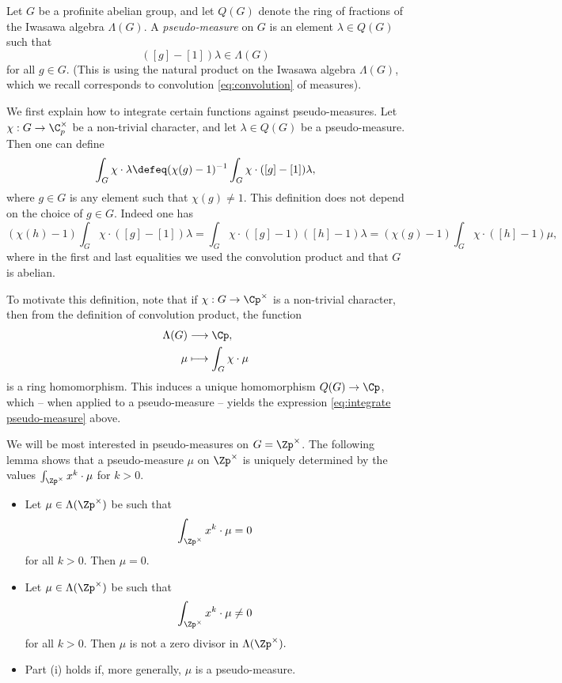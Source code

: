 \documentclass[a4paper,10pt, english, reqno]{smfart}
\numberwithin{equation}{section}
\begin{document}
\begin{definition}
	Let $G$ be a profinite abelian group, and let $Q(G)$ denote the ring of fractions of the Iwasawa algebra $\Lambda(G)$. A \emph{pseudo-measure} on $G$ is an element $\lambda \in Q(G)$ such that 
	\[
 ([g]-[1])\lambda \in \Lambda(G)
 \]
	for all $g \in G$.  (This is using the natural product on the Iwasawa algebra $\Lambda(G)$, which we recall corresponds to convolution \eqref{eq:convolution} of measures).
\end{definition}


 We first explain how to integrate certain functions against pseudo-measures. Let $\chi : G \to \C_p^\times$ be a non-trivial character, and let $\lambda \in Q(G)$ be a pseudo-measure. Then one can define
\begin{equation}\label{eq:integrate pseudo-measure}
\int_G \chi \cdot \lambda \defeq (\chi(g) - 1)^{-1} \int_G \chi \cdot ([g] - [1]) \lambda, 
\end{equation}
where $g \in G$ is any element such that $\chi(g) \neq 1$. This definition does not depend on the choice of $g \in G$. Indeed one has
\[ (\chi(h) - 1) \int_G \chi \cdot ([g] - [1]) \lambda  = \int_G \chi \cdot ([g] - 1) ([h] - 1) \lambda  = (\chi(g) - 1) \int_G \chi \cdot ([h] - 1) \mu, \] 
where in the first and last equalities we used the convolution product and that $G$ is abelian.



 \begin{remark} To motivate this definition, note that if $\chi : G \to \Cp^\times$ is a non-trivial character, then from the definition of convolution product, the function
\begin{align*}
\Lambda(G) &\longrightarrow \Cp,\\
\mu &\longmapsto \int_G \chi \cdot \mu
\end{align*}
is a ring homomorphism. This induces a unique homomorphism $Q(G) \to \Cp$, which -- when applied to a pseudo-measure -- yields the expression \eqref{eq:integrate pseudo-measure} above.
\end{remark}


We will be most interested in pseudo-measures on $G = \Zp^\times$. The following lemma shows that a pseudo-measure $\mu$ on $\Zp^\times$ is uniquely determined by the values $\int_{\Zp^\times}x^k \cdot\mu$ for $k > 0$.

\begin{lemma}\label{lem:zero divisor}
	\begin{itemize}
		\item[(i)]
		Let $\mu \in \Lambda(\Zp^\times)$ be such that
		\[\int_{\Zp^\times} x^k \cdot\mu = 0\]
		for all $k > 0$. Then $\mu = 0$.
		\item[(ii)] Let $\mu \in \Lambda(\Zp^\times)$ be such that
		\[\int_{\Zp^\times} x^k \cdot\mu \neq 0\]
		for all $k > 0$. Then $\mu$ is not a zero divisor in $\Lambda(\Zp^\times).$
		\item[(iii)]Part (i) holds if, more generally, $\mu$ is a pseudo-measure.
	\end{itemize}
\end{lemma}
\end{document}
